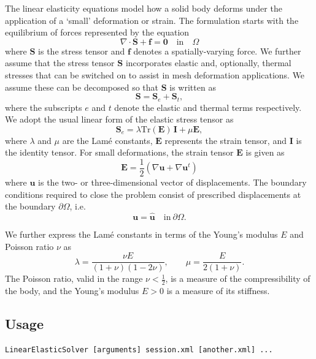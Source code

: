 The linear elasticity equations model how a solid body deforms under the
application of a `small' deformation or strain. The formulation starts with the
equilibrium of forces represented by the equation
%
\begin{equation}
\nabla \cdot \mathbf{S} + \mathbf{f} = \mathbf{0} \quad \textrm{in} \quad \Omega
\label{eq:strong}
\end{equation}
%
where $\mathbf{S}$ is the stress tensor and $\mathbf{f}$ denotes a
spatially-varying force. We further assume that the stress tensor $\mathbf{S}$
incorporates elastic and, optionally, thermal stresses that can be switched on
to assist in mesh deformation applications. We assume these can be decomposed so
that $\mathbf{S}$ is written as
%
\[
\mathbf{S} = \mathbf{S}_e + \mathbf{S}_t,
\]
%
where the subscripts $e$ and $t$ denote the elastic and thermal terms
respectively. We adopt the usual linear form of the elastic stress tensor as
%
\[
\mathbf{S}_e = \lambda\mbox{Tr}(\mathbf{E}) \, \mathbf{I} +\mu \mathbf{E},
\]
%
where $\lambda$ and $\mu$ are the Lam\'e constants, $\mathbf{E}$ represents the
strain tensor, and $\mathbf{I}$ is the identity tensor. For small deformations,
the strain tensor $\mathbf{E}$ is given as
%
\begin{equation}
\mathbf{E} =\frac{1}{2} \left ( \nabla \mathbf{u}+ \nabla \mathbf{u}^t \right )
\end{equation}
%
where $\mathbf{u}$ is the two- or three-dimensional vector of displacements. The
boundary conditions required to close the problem consist of prescribed
displacements at the boundary $\partial \Omega$, i.e.
\begin{equation}
  \mathbf{u} = \hat{\mathbf{u}} \quad \textrm{in}\ \partial \Omega.
\end{equation}

We further express the Lam\'e constants in terms of the Young's modulus $E$ and
Poisson ratio $\nu$ as
%
\[
\lambda = \frac{\nu E}{(1+\nu)(1-2\nu)}, \qquad \mu = \frac{E}{2(1+\nu)}.
\]
%
The Poisson ratio, valid in the range $\nu < \tfrac{1}{2}$, is a measure of the
compressibility of the body, and the Young's modulus $E > 0$ is a measure of its
stiffness.

\subsection{Usage}
\begin{lstlisting}[style=BashInputStyle]
LinearElasticSolver [arguments] session.xml [another.xml] ...
\end{lstlisting}

